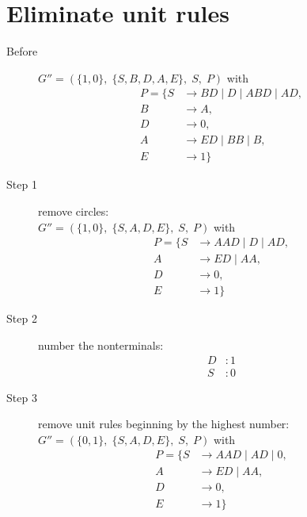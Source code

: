 \documentclass{article}
\begin{document}
\section{Eliminate unit rules}
\begin{description}
	\item[Before] 
	$G''=\left(\{	1, 0\},\;\{ S, B, D, A, E\},\;S,\;P\right)$ with
	\begin{align*}
		P=\{	S &\rightarrow BD\;|\;D\;|\;ABD\;|\;AD, \\ 
		B &\rightarrow A, \\ 
		D &\rightarrow 0, \\ 
		A &\rightarrow ED\;|\;BB\;|\;B, \\ 
		E &\rightarrow 1\}
	\end{align*}
	\item[Step 1] remove circles: \\ 
	$G''=\left(\{	1, 0\},\;\{ S, A, D, E\},\;S,\;P\right)$ with
	\begin{align*}
		P=\{	S &\rightarrow AAD\;|\;D\;|\;AD, \\ 
		A &\rightarrow ED\;|\;AA, \\ 
		D &\rightarrow 0, \\ 
		E &\rightarrow 1\}
	\end{align*}
	\item[Step 2] number the nonterminals:
	\begin{align*}
		D&: 1\\
		S&: 0
	\end{align*}
	\item[Step 3] remove unit rules beginning by the highest number: \\ 
	$G''=\left(\{	0, 1\},\;\{ S, A, D, E\},\;S,\;P\right)$ with
	\begin{align*}
		P=\{	S &\rightarrow AAD\;|\;AD\;|\;0, \\ 
		A &\rightarrow ED\;|\;AA, \\ 
		D &\rightarrow 0, \\ 
		E &\rightarrow 1\}
	\end{align*}
\end{description}
\end{document}
